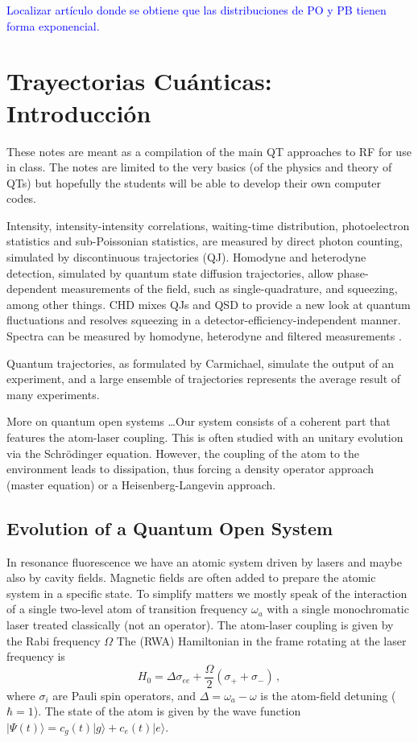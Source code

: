 \documentclass[twocolumn,aps,eqsecnum,showkeys,amsmath]{revtex4}
\providecommand{\ket}[1]{\lvert #1 \rangle}
\begin{document}
\textcolor{blue}{Localizar art\'iculo donde se obtiene que las distribuciones 
de PO y PB tienen forma exponencial.}


\section{Trayectorias Cu\'anticas: Introducci\'on}
These notes are meant as a compilation of the main QT approaches to 
RF for use in class. The notes are limited to the very basics (of the physics 
and theory of QTs) but hopefully the students will be able to develop their 
own computer codes. 

Intensity, intensity-intensity correlations, waiting-time distribution, 
photoelectron statistics and sub-Poissonian statistics, are measured by 
direct photon counting, simulated by discontinuous trajectories (QJ). 
Homodyne and heterodyne detection, simulated by quantum state 
diffusion  trajectories, allow phase-dependent measurements of the field, 
such as single-quadrature, and squeezing, among other things. CHD 
mixes QJs and QSD to provide a new look at quantum fluctuations and 
resolves squeezing in a detector-efficiency-independent manner. Spectra 
can be measured by homodyne, heterodyne and filtered measurements 
\cite{TiCa92,Holl97}. 

Quantum trajectories, as formulated by Carmichael, simulate the output 
of an experiment, and a large ensemble of trajectories represents the 
average result of many experiments. 

More on quantum open systems \ldots Our system consists of a coherent 
part that features the atom-laser coupling. This is often studied with an 
unitary evolution via the Schr\"odinger equation. However, the coupling of 
the atom to the environment leads to dissipation, thus forcing a density 
operator approach (master equation) or a Heisenberg-Langevin approach. 

\subsection{Evolution of a Quantum Open System} %
In resonance fluorescence we have an atomic system driven by lasers 
and maybe also by cavity fields. Magnetic fields are often added to prepare 
the atomic system in a specific state. To simplify matters we mostly speak 
of the interaction of a single two-level atom of transition frequency 
$\omega_a$ with a single monochromatic laser treated classically (not an 
operator). The atom-laser coupling is given by the Rabi frequency 
$\Omega$  The (RWA) Hamiltonian in the frame rotating at the laser 
frequency is 
%
\begin{equation}
H_0 = \Delta \sigma_{ee} +\frac{\Omega}{2}(\sigma_+  +\sigma_-)  \,,
\end{equation}
where $\sigma_i$ are Pauli spin operators, and 
$\Delta= \omega_a -\omega$ is the atom-field detuning ($\hbar=1$). 
The state of the atom is given by the wave function 
$\ket{\Psi (t)} = c_g(t) \ket{g} +c_e(t) \ket{e}$. 
\end{document}
